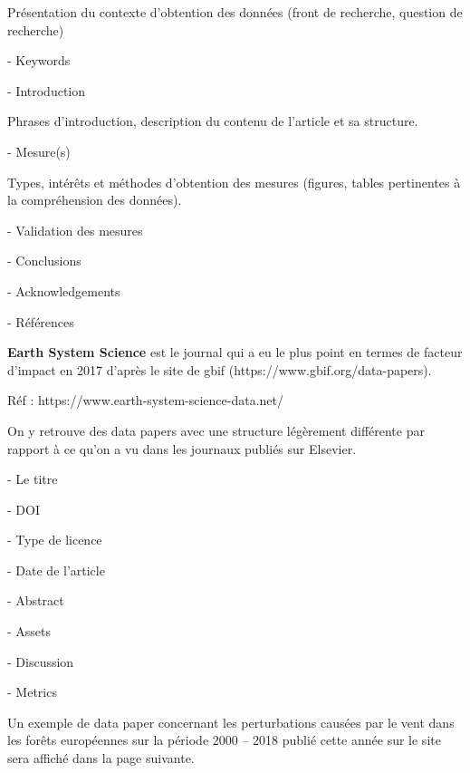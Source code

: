 \documentclass[11pt,oneside]{article}
\begin{document}
\begin{flushleft}
Présentation du contexte d’obtention des données (front de recherche, question de recherche)
\end{flushleft}

-	Keywords

-	Introduction

\begin{flushleft}
Phrases d’introduction, description du contenu de l’article et sa structure.
\end{flushleft}

-	Mesure(s)

\begin{flushleft}
Types, intérêts et méthodes d’obtention des mesures (figures, tables pertinentes à la compréhension des données).
\end{flushleft}

-	Validation des mesures

-	Conclusions

-	Acknowledgements

-	Références

\newpage
\begin{flushleft}
\textbf{Earth System Science} est le journal qui a eu le plus point en termes de facteur d’impact en 2017 d’après le site de gbif (https://www.gbif.org/data-papers).
\end{flushleft}

\begin{flushleft}
Réf : https://www.earth-system-science-data.net/
\end{flushleft}

\begin{flushleft}
On y retrouve des data papers avec une structure légèrement différente par rapport à ce qu’on a vu dans les journaux publiés sur Elsevier.
\end{flushleft}

-	Le titre

-	DOI

-	Type de licence

-	Date de l’article

-	Abstract

-	Assets

-	Discussion

-	Metrics

\begin{flushleft}
Un exemple de data paper concernant les perturbations causées par le vent dans les forêts européennes sur la période 2000 – 2018 publié cette année sur le site sera affiché dans la page suivante.
\end{flushleft}
\end{document}
